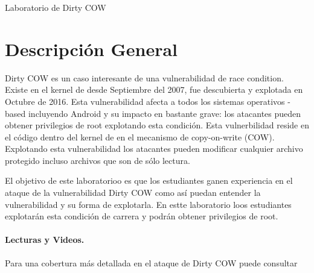 
\newcommand{\commonfolder}{../../common-files}





\newcommand{\cowFigs}{./Figs}





\begin{center}
{\LARGE Laboratorio de Dirty COW }
\end{center}




\section{Descripción General}

Dirty COW es un caso interesante de una vulnerabilidad de race condition. Existe en el kernel de \linux desde Septiembre del 2007, fue descubierta y explotada en Octubre de 2016. 
Esta vulnerabilidad afecta a todos los sistemas operativos \linux-based incluyendo Android y su impacto en bastante grave: los atacantes pueden obtener privilegios de root explotando esta condición. Esta vulnerbilidad reside en el código dentro del kernel de \linux en el mecanismo de copy-on-write (COW). Explotando esta vulnerabilidad los atacantes pueden modificar cualquier archivo protegido incluso archivos que son de sólo lectura.

El objetivo de este laboratorioo es que los estudiantes ganen experiencia en el ataque de la vulnerabilidad Dirty COW como así puedan entender la vulnerabilidad y su forma de explotarla. En estte laboratorio loos estudiantes explotarán esta condición de carrera y podrán obtener privilegios de root.
 

\paragraph{Lecturas y Videos.}
Para una cobertura más detallada en el ataque de Dirty COW puede consultar

